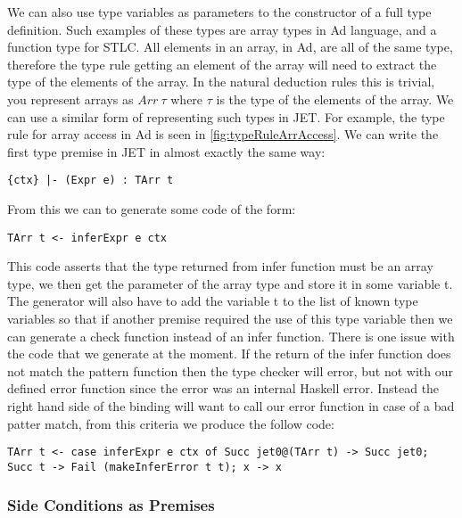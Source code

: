 We can also use type variables as parameters to the constructor of a full type definition.
Such examples of these types are array types in Ad language, and a function type for STLC.
All elements in an array, in Ad, are all of the same type, therefore the type rule getting an element of the array will need to extract the type of the elements of the array.
In the natural deduction rules this is trivial, you represent arrays as $Arr~\tau$ where $\tau$ is the type of the elements of the array.
We can use a similar form of representing such types in JET.
For example, the type rule for array access in Ad is seen in \autoref{fig:typeRuleArrAccess}.
We can write the first type premise in JET in almost exactly the same way:
\begin{lstlisting}[numbers=none]
{ctx} |- (Expr e) : TArr t 
\end{lstlisting}
From this we can to generate some code of the form:
\begin{lstlisting}[numbers=none]
TArr t <- inferExpr e ctx
\end{lstlisting}
This code asserts that the type returned from infer function must be an array type, we then get the parameter of the array type and store it in some variable t.
The generator will also have to add the variable t to the list of known type variables so that if another premise required the use of this type variable then we can generate a check function instead of an infer function.
There is one issue with the code that we generate at the moment.
If the return of the infer function does not match the pattern function then the type checker will error, but not with our defined error function since the error was an internal Haskell error.
Instead the right hand side of the binding will want to call our error function in case of a bad patter match, from this criteria we produce the follow code:
\begin{lstlisting}[numbers=none]
TArr t <- case inferExpr e ctx of Succ jet0@(TArr t) -> Succ jet0; Succ t -> Fail (makeInferError t t); x -> x
\end{lstlisting}

\subsubsection{Side Conditions as Premises}

